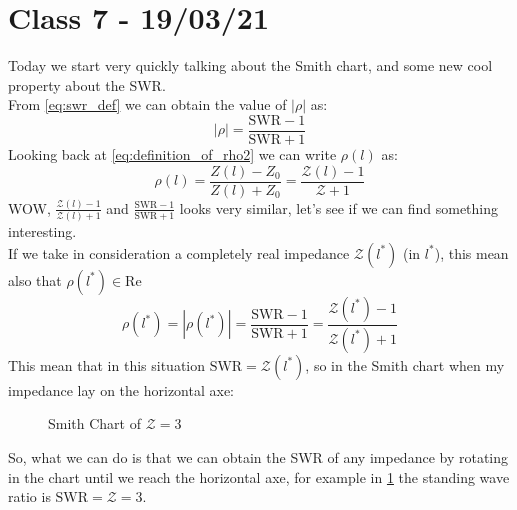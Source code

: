 \section{Class 7 - 19/03/21}
Today we start very quickly talking about the Smith chart, and some new cool property about the SWR.\\
From \cref{eq:swr_def} we can obtain the value of $|\rho|$ as:
\begin{equation}
    |\rho|=\frac{\text{SWR}-1}{\text{SWR}+1}
\end{equation}
Looking back at \cref{eq:definition_of_rho2} we can write $\rho(l)$ as:
\begin{equation}
    \rho(l)=\frac{Z(l)-Z_0}{Z(l)+Z_0}=\frac{\mathcal{Z}(l)-1}{\mathcal{Z}+1}
\end{equation}
WOW, $\frac{\mathcal{Z}(l)-1}{\mathcal{Z}(l)+1}$ and $\frac{\text{SWR}-1}{\text{SWR}+1}$ looks very similar, let's see if we can find something interesting.\\
If we take in consideration a completely real impedance $\mathcal{Z}(l^*)$ (in $l^*$), this mean also that $\rho(l^*)\in \text{Re}$
\begin{equation}
    \rho(l^*)=|\rho(l^*)|=\frac{\text{SWR}-1}{\text{SWR}+1}=\frac{\mathcal{Z}(l^*)-1}{\mathcal{Z}(l^*)+1}
\end{equation}
This mean that in this situation $\text{SWR}=\mathcal{Z}(l^*)$, so in the Smith chart when my impedance lay on the horizontal axe:
\begin{figure}[H]
    \begin{center}
    \end{center}\caption{Smith Chart of $\mathcal{Z} = 3$}\label{fig:smith_real_value} 
\end{figure}
So, what we can do is that we can obtain the SWR of any impedance by rotating in the chart until we reach the horizontal axe, for example in \cref{fig:smith_real_value} the standing wave ratio is $\text{SWR}=\mathcal{Z} = 3$.
